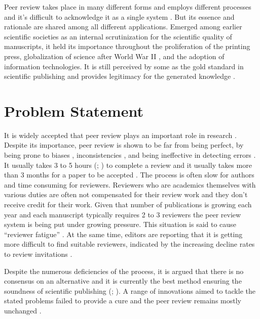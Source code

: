 Peer review takes place in many different forms and employs different processes and it’s difficult to acknowledge it as a single system \parencite[2]{HorbachS.P.J.M..2017}. But its essence and rationale are shared among all different applications. Emerged among earlier scientific societies as an internal scrutinization for the scientific quality of manuscripts, it held its importance throughout the proliferation of the printing press, globalization of science after World War II \parencite{Fyfe.2017}, and the adoption of information technologies. It is still perceived by some as the gold standard in scientific publishing \parencite{Mayden.2012} and provides legitimacy for the generated knowledge \parencite{Tennant.2020c}.

\section{Problem Statement} \label{sec:problem-statement}

It is widely accepted that peer review plays an important role in research \parencite{Publons.2018, Taylor&Francis.2015, Ware.2008, Zuckerman.1971}. Despite its importance, peer review is shown to be far from being perfect, by being prone to biases \parencite{Lee.2013, Mahoney.1977}, inconsistencies \parencite{Peters.1982, Rothwell.2000}, and being ineffective in detecting errors \parencite{Schroter.2004}. It usually takes 3 to 5 hours (\cite[146]{Mulligan.2013}; \cite[42]{Ware.2008}) to complete a review and it usually takes more than 3 months for a paper to be accepted \parencite[51]{Ware.2008}. The process is often slow for authors and time consuming for reviewers. Reviewers who are academics themselves with various duties are often not compensated for their review work and they don’t receive credit for their work. Given that number of publications is growing each year \parencite{Bornmann.2015} and each manuscript typically requires 2 to 3 reviewers the peer review system is being put under growing pressure. This situation is said to cause “reviewer fatigue” \parencite{Breuning.2015}. At the same time, editors are reporting that it is getting more difficult to find suitable reviewers, indicated by the increasing decline rates to review invitations \parencite{Baveye.2011, Fox.2017}. 

Despite the numerous deficiencies of the process, it is argued that there is no consensus on an alternative \parencite{Smith.2006, Young.2003} and it is currently the best method ensuring the soundness of scientific publishing (\cite[5201]{Grainger.2007}; \cite[2]{HorbachS.P.J.M..2017}). A range of innovations aimed to tackle the stated problems failed to provide a cure and the peer review remains mostly unchanged \parencite{Tennant.2017}. 


